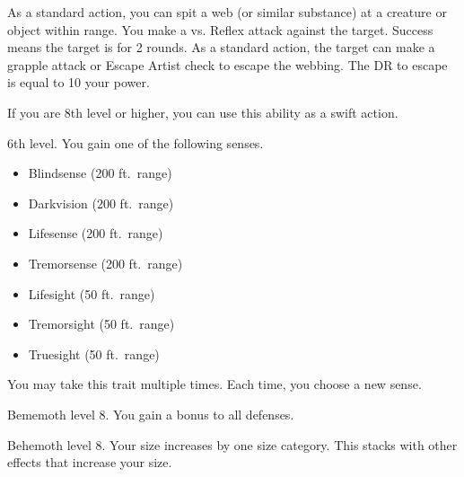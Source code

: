     \featben As a standard action, you can spit a web (or similar substance) at a creature or object within \rngmed range.
    You make a  vs. Reflex attack against the target.
    Success means the target is \immobilized for 2 rounds.
    As a standard action, the target can make a grapple attack or Escape Artist check to escape the webbing.
    The DR to escape is equal to 10 \add your power.

    If you are 8th level or higher, you can use this ability as a swift action.

    \featpre 6th level.
    \featben You gain one of the following senses.
    \begin{itemize}
        \item Blindsense (200 ft.\ range)
        \item Darkvision (200 ft.\ range)
        \item Lifesense (200 ft.\ range)
        \item Tremorsense (200 ft.\ range)
        \item Lifesight (50 ft.\ range)
        \item Tremorsight (50 ft.\ range)
        \item Truesight (50 ft.\ range)
    \end{itemize}
     You may take this trait multiple times.
    Each time, you choose a new sense.

    \featpre Bememoth level 8.
    \featben You gain a  bonus to all defenses.

    \featpre Behemoth level 8.
    \featben Your size increases by one size category.
    This stacks with other effects that increase your size.

